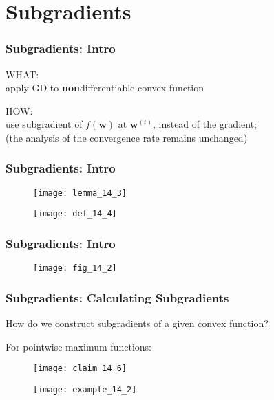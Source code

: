 \section{Subgradients}

\begin{frame}
\frametitle{Subgradients: Intro}

WHAT:\\
apply GD to \textbf{non}differentiable convex function
\vspace{5mm}

HOW:\\
use subgradient of $f(\mathbf{w})$ at $\mathbf{w}^{(t)}$, instead of the gradient;\\
(the analysis of the convergence rate remains unchanged)

\end{frame}

\begin{frame}
\frametitle{Subgradients: Intro}

\begin{figure}
    \centering
    \texttt{[image: lemma\_14\_3]}
\end{figure}

\noindent\makebox[\linewidth]{\rule{\paperwidth}{0.4pt}}

\begin{figure}
    \centering
    \texttt{[image: def\_14\_4]}
\end{figure}

\end{frame}

\begin{frame}
\frametitle{Subgradients: Intro}

\begin{figure}
    \centering
    \texttt{[image: fig\_14\_2]}
\end{figure}

\end{frame}

\begin{frame}
\frametitle{Subgradients: Calculating Subgradients}

How do we construct subgradients of a given convex function?
\vspace{5mm}

For pointwise maximum functions:
\begin{figure}
    \centering
    \texttt{[image: claim\_14\_6]}
\end{figure}

\begin{figure}
    \centering
    \texttt{[image: example\_14\_2]}
\end{figure}

\end{frame}
